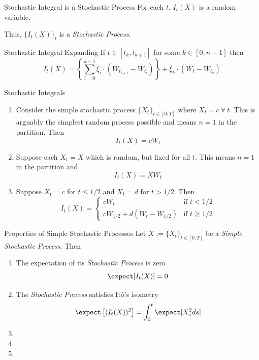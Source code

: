 \documentclass[11pt,a4paper]{article}
\begin{document}
  \begin{remark}{Stochastic Integral is a Stochastic Process}
    For each $t$, $I_t(X)$ is a random variable.
    \par Thus, $\{I_t(X)\}_t$ is a \textit{Stochastic Process}.
  \end{remark}

  \begin{remark}{Stochastic Integral Expanding}
    If $t\in[t_k,t_{k+1}]$ for some $k\in[0,n-1]$ then
    \[ I_t(X)=\left\{\sum_{i=0}^{k-1}\xi_i\cdot(W_{t_{i+1}}-W_{t_i})\right\}+\xi_k\cdot(W_t-W_{t_k}) \]
  \end{remark}

  \begin{example}{Stochastic Integrals}
    \begin{enumerate}
      \item Consider the simple stochastic process $\{X_t\}_{t\in[0,T]}$ where $X_t=c\ \forall\ t$. This is arguably the simplest random process possible and means $n=1$ in the partition. Then
      \[ I_t(X)=cW_t \]
      \item Suppose each $X_t=X$ which is random, but fixed for all $t$. This means $n=1$ in the partition and
      \[ I_t(X)=XW_t \]
      \item Suppose $X_t=c$ for $t\leq1/2$ and $X_t=d$ for $t>1/2$. Then
      \[ I_t(X)=\begin{cases}cW_t&\text{if }t<1/2\\cW_{1/2}+d(W_t-W_{1/2})&\text{if }t\geq1/2\end{cases} \]
    \end{enumerate}
  \end{example}

  \begin{theorem}{Properties of Simple Stochastic Processes}\label{the_properties_of_simple_stochastic_processes}
    Let $X:=\{X_t\}_{t\in[0,T]}$ be a \textit{Simple Stochastic Process}. Then
    \begin{enumerate}
      \item The expectation of its \textit{Stochastic Process} is zero
      \[ \expect[I_t(X)]=0 \]
      \item The \textit{Stochastic Process} satisfies It\^o's isometry
      \[ \expect\left[(I_t(X))^2\right]=\int_0^t\expect[X_s^2ds] \]
      \item
      \item
      \item
    \end{enumerate}
  \end{theorem}
\end{document}
